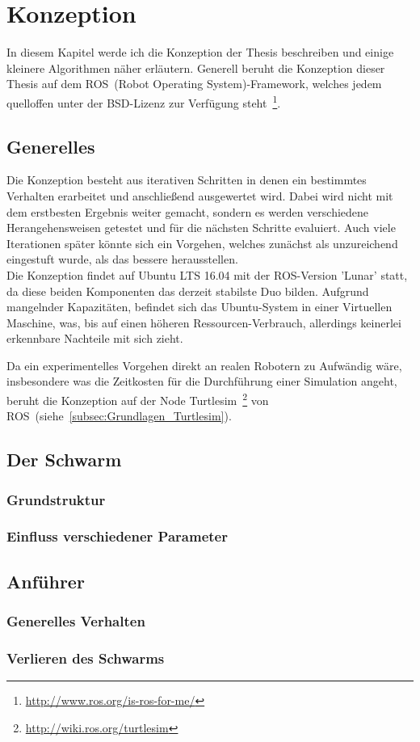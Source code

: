 \chapter{Konzeption}\label{ch:Konzeption}

In diesem Kapitel werde ich die Konzeption der Thesis beschreiben und einige kleinere Algorithmen näher erläutern. Generell beruht die Konzeption dieser Thesis auf dem ROS~(Robot Operating System)-Framework, welches jedem quelloffen unter der BSD-Lizenz zur Verfügung steht~\footnote{\url{http://www.ros.org/is-ros-for-me/}}.

\section{Generelles}
Die Konzeption besteht aus iterativen Schritten in denen ein bestimmtes Verhalten erarbeitet und anschließend ausgewertet wird. Dabei wird nicht mit dem erstbesten Ergebnis weiter gemacht, sondern es werden verschiedene Herangehensweisen getestet und für die nächsten Schritte evaluiert. Auch viele Iterationen später könnte sich ein Vorgehen, welches zunächst als unzureichend eingestuft wurde, als das bessere herausstellen.\\

Die Konzeption findet auf Ubuntu LTS 16.04 mit der ROS-Version 'Lunar' statt, da diese beiden Komponenten das derzeit stabilste Duo bilden. Aufgrund mangelnder Kapazitäten, befindet sich das Ubuntu-System in einer Virtuellen Maschine, was, bis auf einen höheren Ressourcen-Verbrauch, allerdings keinerlei erkennbare Nachteile mit sich zieht.

Da ein experimentelles Vorgehen direkt an realen Robotern zu Aufwändig wäre, insbesondere was die Zeitkosten für die Durchführung einer Simulation angeht, beruht die Konzeption auf der Node Turtlesim~\footnote{\url{http://wiki.ros.org/turtlesim}} von ROS~(siehe~\autoref{subsec:Grundlagen_Turtlesim}).

\section{Der Schwarm}


\subsection*{Grundstruktur}

\subsection*{Einfluss verschiedener Parameter}

\section{Anführer}

\subsection*{Generelles Verhalten}

\subsection*{Verlieren des Schwarms}